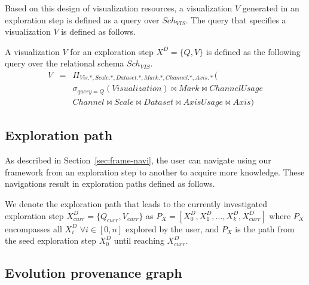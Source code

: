 Based on this design of visualization resources, a visualization $V$ generated in an exploration step is defined as a query over $Sch_{VIS}$.
The query that specifies a visualization $V$ is defined as follows.

\begin{definition} 
\label{def:vis-resource}
A visualization $V$ for an exploration step $X^D=\{Q,V\}$  is defined as the following query over %
the relational schema $Sch_{VIS}$.
\begin{eqnarray*}
V &= &  \Pi_{Vis.*, Scale.*, Dataset.*, Mark.*, Channel.*, Axis.*}(\\
& & \sigma_{query = Q}(Visualization) \Join Mark \Join ChannelUsage\\
& & Channel \Join Scale \Join Dataset  \Join AxisUsage \Join Axis)
\end{eqnarray*}
\end{definition} 



\subsection{Exploration path} 
\label{sec:expo-path}
As described in Section~\ref{sec:frame-navi}, the user can navigate using our framework \framework{}  from an exploration step to another to acquire more knowledge.
These navigations result in exploration paths defined as follows.



 \begin{definition} \label{explo:path} 
We denote the exploration path that leads to the currently investigated exploration step $X_{curr}^D=\{Q_{curr},V_{curr}\}$ as $P_X = [X_0^D, X_1^D, \ldots, X_k^D, X_{curr}^D]$ where $P_X$ encompasses all $X_i^D$  $\forall i \in [0,n]$ explored by the user, and $P_X$ is the path from the seed exploration step 
  $X_0^D$ until reaching $X_{curr}^D$.
\end{definition}


	\subsection{Evolution provenance graph}
	\label{subsec:evo}

